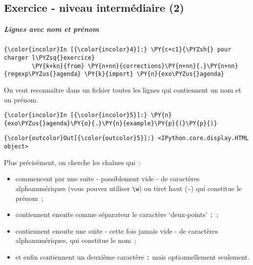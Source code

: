     \hypertarget{exercice---niveau-intermuxe9diaire-2}{%
\subsection{Exercice - niveau intermédiaire
(2)}\label{exercice---niveau-intermuxe9diaire-2}}

    \hypertarget{lignes-avec-nom-et-pruxe9nom}{%
\subparagraph{Lignes avec nom et
prénom}\label{lignes-avec-nom-et-pruxe9nom}}

    \begin{Verbatim}[commandchars=\\\{\},frame=single,framerule=0.3mm,rulecolor=\color{cellframecolor}]
{\color{incolor}In [{\color{incolor}4}]:} \PY{c+c1}{\PYZsh{} pour charger l\PYZsq{}exercice}
        \PY{k+kn}{from} \PY{n+nn}{corrections}\PY{n+nn}{.}\PY{n+nn}{regexp\PYZus{}agenda} \PY{k}{import} \PY{n}{exo\PYZus{}agenda}
\end{Verbatim}


    On veut reconnaître dans un fichier toutes les lignes qui contiennent un
nom et un prénom.

    \begin{Verbatim}[commandchars=\\\{\},frame=single,framerule=0.3mm,rulecolor=\color{cellframecolor}]
{\color{incolor}In [{\color{incolor}5}]:} \PY{n}{exo\PYZus{}agenda}\PY{o}{.}\PY{n}{example}\PY{p}{(}\PY{p}{)}
\end{Verbatim}


\begin{Verbatim}[commandchars=\\\{\},frame=single,framerule=0.3mm,rulecolor=\color{cellframecolor}]
{\color{outcolor}Out[{\color{outcolor}5}]:} <IPython.core.display.HTML object>
\end{Verbatim}
            
    Plus précisément, on cherche les chaînes qui~:

\begin{itemize}
\tightlist
\item
  commencent par une suite - possiblement vide - de caractères
  alphanumériques (vous pouvez utiliser \texttt{\textbackslash{}w}) ou
  tiret haut (\texttt{-}) qui constitue le prénom~;
\item
  contiennent ensuite comme séparateur le caractère `deux-points'
  \texttt{:}~;
\item
  contiennent ensuite une suite - cette fois jamais vide - de caractères
  alphanumériques, qui constitue le nom~;
\item
  et enfin contiennent un deuxième caractère \texttt{:} mais
  optionnellement seulement.
\end{itemize}

